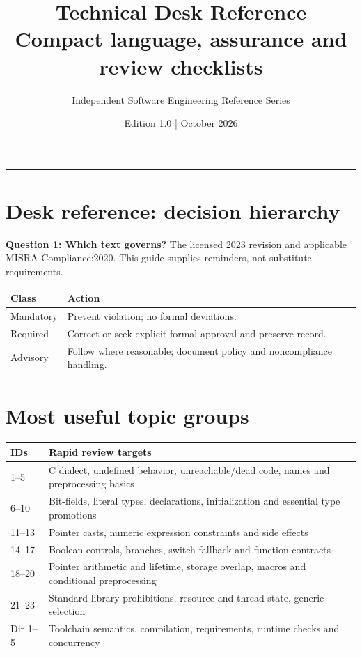 \documentclass[10pt,letterpaper]{article}
\title{\vspace{-2.3em}\color{DeepNavy}\Huge\bfseries Technical Desk Reference\\[0.45em]\large\normalfont\color{Teal} Compact language, assurance and review checklists}
\author{Independent Software Engineering Reference Series}
\date{Edition 1.0 \quad | \quad October 2026}
\begin{document}
\maketitle
\vspace{-0.4em}
\begin{center}\color{Slate}\rule{0.83\linewidth}{0.4pt}\end{center}
\DocNotes
\tableofcontents
\newpage

\section{Desk reference: decision hierarchy}
\begin{keybox}\textbf{Question 1: Which text governs?} The licensed 2023 revision and applicable MISRA Compliance:2020. This guide supplies reminders, not substitute requirements.\end{keybox}
\begin{tabularx}{\linewidth}{@{}p{.25\linewidth}X@{}}\toprule
Class & Action\\\midrule
Mandatory & Prevent violation; no formal deviations.\\
Required & Correct or seek explicit formal approval and preserve record.\\
Advisory & Follow where reasonable; document policy and noncompliance handling.\\\bottomrule\end{tabularx}
\section{Most useful topic groups}
\begin{tabularx}{\linewidth}{@{}p{.18\linewidth}X@{}}\toprule
IDs & Rapid review targets\\\midrule
1--5 & C dialect, undefined behavior, unreachable/dead code, names and preprocessing basics\\
6--10 & Bit-fields, literal types, declarations, initialization and essential type promotions\\
11--13 & Pointer casts, numeric expression constraints and side effects\\
14--17 & Boolean controls, branches, switch fallback and function contracts\\
18--20 & Pointer arithmetic and lifetime, storage overlap, macros and conditional preprocessing\\
21--23 & Standard-library prohibitions, resource and thread state, generic selection\\
Dir 1--5 & Toolchain semantics, compilation, requirements, runtime checks and concurrency\\\bottomrule\end{tabularx}
\end{document}
